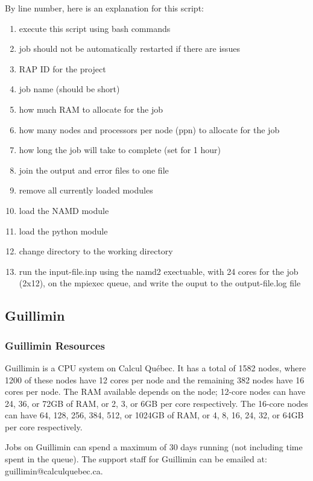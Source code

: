 \documentclass[12pt]{article}
\begin{document}
\quad By line number, here is an explanation for this script:

\begin{enumerate}
\item execute this script using bash commands
\item job should not be automatically restarted if there are issues
\item RAP ID for the project
\item job name (should be short)
\item how much RAM to allocate for the job
\item how many nodes and processors per node (ppn) to allocate for the job
\item how long the job will take to complete (set for 1 hour)
\item join the output and error files to one file
\item remove all currently loaded modules
\item load the NAMD module
\item load the python module
\item change directory to the working directory
\item run the input-file.inp using the namd2 exectuable, with 24 cores for the job (2x12), on the mpiexec queue, and write the ouput to the output-file.log file
\end{enumerate}

\subsection{Guillimin}
\subsubsection{Guillimin Resources}

\quad Guillimin is a CPU system on Calcul Qu\'{e}bec. It has a total of 1582 nodes, where 1200 of these nodes have 12 cores per node and the remaining 382 nodes have 16 cores per node. The RAM available depends on the node; 12-core nodes can have 24, 36, or 72GB of RAM, or 2, 3, or 6GB per core respectively. The 16-core nodes can have 64, 128, 256, 384, 512, or 1024GB of RAM, or 4, 8, 16, 24, 32, or 64GB per core respectively.

\quad Jobs on Guillimin can spend a maximum of 30 days running (not including time spent in the queue). The support staff for Guillimin can be emailed at: guillimin@calculquebec.ca.
\end{document}
